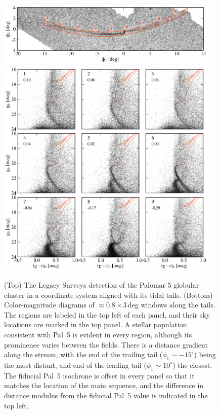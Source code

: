 \documentclass[modern]{aastex62}
\begin{document}
\begin{figure}
\begin{center}
\includegraphics[width=0.95\textwidth]{fig1_a_map.pdf}
\includegraphics[width=0.95\textwidth]{fig1_b_cmds.pdf}
\end{center}
\caption{
(Top) The Legacy Surveys detection of the Palomar 5 globular cluster in a coordinate system aligned with its tidal tails.
(Bottom) Color-magnitude diagrams of $\approx0.8\times3$\,deg windows along the tails.
The regions are labeled in the top left of each panel, and their sky locations are marked in the top panel.
A stellar population consistent with Pal~5 is evident in every region, although its prominence varies between the fields.
There is a distance gradient along the stream, with the end of the trailing tail ($\phi_1\sim-15^\circ$) being the most distant, and end of the leading tail ($\phi_1\sim10^\circ$) the closest.
The fiducial Pal~5 isochrone is offset in every panel so that it matches the location of the main sequence, and the difference in distance modulus from the fiducial Pal~5 value is indicated in the top left.
}
\label{fig:cmds}
\end{figure}
\end{document}
